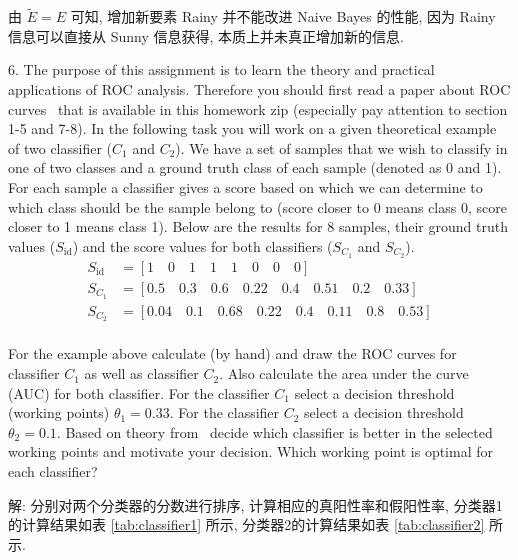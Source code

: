 \documentclass[openany]{ctexbook}
\theoremstyle{kaiti}
\theoremstyle{normal}
\begin{document}
由 $\tilde{E}=E$ 可知, 增加新要素 Rainy 并不能改进 Naive Bayes 的性能, 因为 Rainy 信息可以直接从 Sunny 信息获得, 本质上并未真正增加新的信息.

6. The purpose of this assignment is to learn the theory and practical applications of ROC analysis. Therefore you should first read a paper about ROC curves~\cite{2006fawcett} that is available in this homework zip (especially pay attention to section 1-5 and 7-8). In the following task you will work on a given theoretical example of two classifier ($C_1$ and $C_2$). We have a set of samples that we wish to classify in one of two classes and a ground truth class of each sample (denoted as 0 and 1). For each sample a classifier gives a score based on which we can determine to which class should be the sample belong to (score closer to 0 means class 0, score closer to 1 means class 1). Below are the results for 8 samples, their ground truth values ($S_{\text{id}}$) and the score values for both classifiers ($S_{C_1}$ and $S_{C_2}$).
\begin{equation}
  \begin{aligned}
    S_{\text{id}} &= [1\quad 0 \quad 1 \quad 1 \quad 1 \quad 0 \quad 0 \quad 0]\\
    S_{C_1} &= [0.5\quad 0.3 \quad 0.6 \quad 0.22 \quad 0.4 \quad 0.51 \quad 0.2 \quad 0.33] \\
    S_{C_2} &= [0.04\quad 0.1 \quad 0.68 \quad 0.22 \quad 0.4 \quad 0.11 \quad 0.8 \quad 0.53]\\
  \end{aligned}
\end{equation}

For the example above calculate (by hand) and draw the ROC curves for classifier $C_1$ as well as classifier $C_2$. Also calculate the area under the curve (AUC) for both classifier. For the classifier $C_1$ select a decision threshold (working points) $\theta_{1}=0.33$. For the classifier $C_2$ select a decision threshold  $\theta_{2}=0.1$.  Based on theory from~\cite{2006fawcett} decide which classifier is better in the selected working points and motivate your decision. Which working point is optimal for each classifier? 

解: 分别对两个分类器的分数进行排序, 计算相应的真阳性率和假阳性率, 分类器1的计算结果如表 \ref{tab:classifier1} 所示, 分类器2的计算结果如表 \ref{tab:classifier2} 所示.
\end{document}

